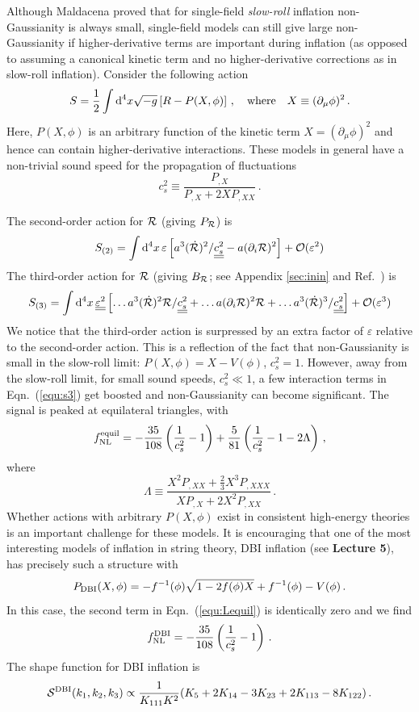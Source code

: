 \documentclass[12pt,letterpaper,rotate]{article}
\def\beq{\begin{equation}}
\def\eeq{\end{equation}}
\def\d{{\rm d}}
\def\R{{\cal R}}
\begin{document}
{Although Maldacena proved that for single-field {\it slow-roll} inflation non-Gaussianity is always small, single-field models can still give large non-Gaussianity if higher-derivative terms are important during inflation (as opposed to assuming a canonical kinetic term and no higher-derivative corrections as in slow-roll inflation).
Consider the following action
\beq
S = \frac{1}{2} \int \d^4 x \sqrt{-g} \left[ R - P(X, \phi)\right]\, , \quad {\rm where} \quad X \equiv (\partial_\mu \phi)^2\, .
\eeq
Here, $P(X, \phi)$ is an arbitrary function of the kinetic term $X=(\partial_\mu \phi)^2$ and hence can contain higher-derivative interactions.
These models in general have a non-trivial sound speed for the propagation of fluctuations
\beq
c_s^2 \equiv \frac{P_{,X}}{P_{,X} + 2 X P_{,XX}}\, .
\eeq

The second-order action for $\R$ (giving $P_\R$) is \cite{Chen:2006nt}
\beq
S_{(2)} = \int \d^4 x \, \varepsilon \left[ a^3 (\dot \R)^2/ \underline{\underline{c_s^2}} - a (\partial_i \R)^2\right] + {\cal O}(\varepsilon^2)
\eeq
The third-order action for $\R$ (giving $B_\R$; see Appendix \ref{sec:inin} and Ref.~\cite{Chen:2006nt}) is
\beq
\label{equ:s3}
S_{(3)} = \int \d^4 x\, \underline{\underline{\varepsilon^2}} \left[ \dots a^3 (\dot \R)^2 \R/ \underline{\underline{c_s^2}} + \dots a (\partial_i \R)^2 \R + \dots a^3 (\dot \R)^3/ \underline{\underline{c_s^2}} \right] + {\cal O}(\varepsilon^3)
\eeq
We notice that the third-order action
is surpressed by an extra factor of $\varepsilon$ relative to the second-order action.
This is a reflection of the fact that non-Gaussianity is small in the 
slow-roll limit: $P(X, \phi) = X- V(\phi)$, $c_s^2 = 1$.
However, away from the slow-roll limit, for small sound speeds, $c_s^2 \ll 1$, a few interaction terms in Eqn.~(\ref{equ:s3}) get boosted and non-Gaussianity can become significant.
The
signal is peaked at equilateral triangles, with 
\beq
\label{equ:Lequil}
f_{\rm NL}^{\rm equil} = - \frac{35}{108} \left( \frac{1}{c_s^2} -1 \right) + \frac{5}{81} \left( \frac{1}{c_s^2} - 1 - 2 \Lambda \right)\, ,
\eeq
where
\beq
\Lambda \equiv \frac{X^2 P_{,XX} + \frac{2}{3} X^3 P_{,XXX}}{X P_{,X} + 2 X^2 P_{,XX}}\, .
\eeq
Whether actions with arbitrary $P(X,\phi)$ exist in consistent high-energy theories is an important challenge for these models.
It is encouraging that one of the most interesting models of inflation in string theory,
DBI inflation \cite{DBI} (see {\bf Lecture 5}), has precisely such a structure with
\beq
P_{\rm DBI}(X, \phi) = - f^{-1}(\phi) \sqrt{1-2 f(\phi) X} + f^{-1}(\phi) - V(\phi)\, .
\eeq
In this case, the
second term in Eqn.~(\ref{equ:Lequil}) is identically zero and  we find
\beq
\label{equ:Lequil}
f_{\rm NL}^{\rm DBI} = - \frac{35}{108} \left( \frac{1}{c_s^2} -1 \right) \, .
\eeq
The shape function for DBI inflation is
\beq
\label{equ:SDBI}
{\cal S}^{\rm DBI}(k_1,k_2,k_3) \propto \frac{1}{K_{111} K^2} (K_5+ 2 K_{14} - 3 K_{23} +2 K_{113}-8 K_{122})\, .
\eeq

}
\end{document}
